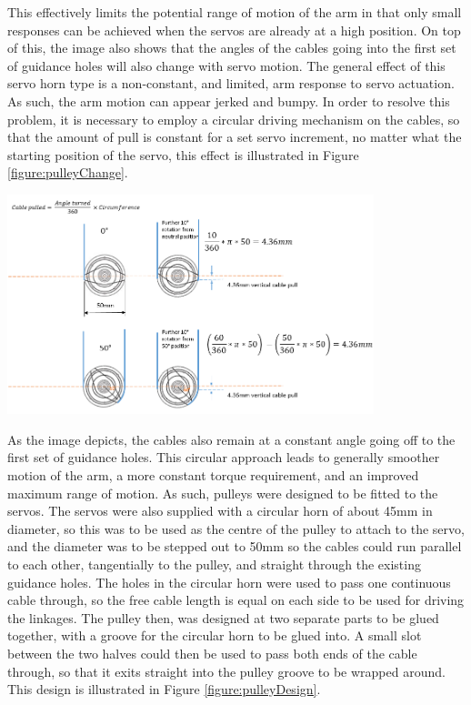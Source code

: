 \documentclass[11pt]{article}
\begin{document}
This effectively limits the potential range of motion of the arm in that only small responses can be achieved when the servos are already at a high position. On top of this, the image also shows that the angles of the cables going into the first set of guidance holes will also change with servo motion. The general effect of this servo horn type is a non-constant, and limited, arm response to servo actuation. As such, the arm motion can appear jerked and bumpy. In order to resolve this problem, it is necessary to employ a circular driving mechanism on the cables, so that the amount of pull is constant for a set servo increment, no matter what the starting position of the servo, this effect is illustrated in Figure \ref{figure:pulleyChange}.
 
\begin{center}
\includegraphics[width=0.8\textwidth]{images/pulleyChange.png}
\label{figure:pulleyChange}
\end{center}
 

As the image depicts, the cables also remain at a constant angle going off to the first set of guidance holes. This circular approach leads to generally smoother motion of the arm, a more constant torque requirement, and an improved maximum range of motion. As such, pulleys were designed to be fitted to the servos. The servos were also supplied with a circular horn of about 45mm in diameter, so this was to be used as the centre of the pulley to attach to the servo, and the diameter was to be stepped out to 50mm so the cables could run parallel to each other, tangentially to the pulley, and straight through the existing guidance holes. The holes in the circular horn were used to pass one continuous cable through, so the free cable length is equal on each side to be used for driving the linkages. The pulley then, was designed at two separate parts to be glued together, with a groove for the circular horn to be glued into. A small slot between the two halves could then be used to pass both ends of the cable through, so that it exits straight into the pulley groove to be wrapped around. This design is illustrated in Figure \ref{figure:pulleyDesign}.
\end{document}
